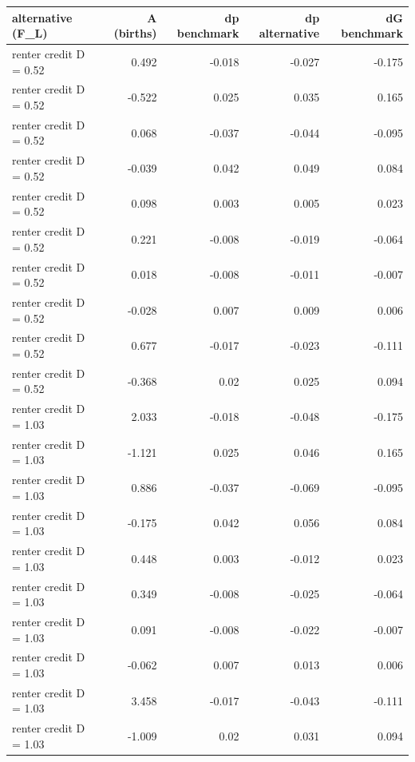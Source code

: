 \begin{tabular}{lrrrr}
\toprule
alternative (F\_L) & A (births) & dp benchmark & dp alternative & dG benchmark \\
\midrule
renter credit D = 0.52 & 0.492 & -0.018 & -0.027 & -0.175 \\
renter credit D = 0.52 & -0.522 & 0.025 & 0.035 & 0.165 \\
renter credit D = 0.52 & 0.068 & -0.037 & -0.044 & -0.095 \\
renter credit D = 0.52 & -0.039 & 0.042 & 0.049 & 0.084 \\
renter credit D = 0.52 & 0.098 & 0.003 & 0.005 & 0.023 \\
renter credit D = 0.52 & 0.221 & -0.008 & -0.019 & -0.064 \\
renter credit D = 0.52 & 0.018 & -0.008 & -0.011 & -0.007 \\
renter credit D = 0.52 & -0.028 & 0.007 & 0.009 & 0.006 \\
renter credit D = 0.52 & 0.677 & -0.017 & -0.023 & -0.111 \\
renter credit D = 0.52 & -0.368 & 0.02 & 0.025 & 0.094 \\
renter credit D = 1.03 & 2.033 & -0.018 & -0.048 & -0.175 \\
renter credit D = 1.03 & -1.121 & 0.025 & 0.046 & 0.165 \\
renter credit D = 1.03 & 0.886 & -0.037 & -0.069 & -0.095 \\
renter credit D = 1.03 & -0.175 & 0.042 & 0.056 & 0.084 \\
renter credit D = 1.03 & 0.448 & 0.003 & -0.012 & 0.023 \\
renter credit D = 1.03 & 0.349 & -0.008 & -0.025 & -0.064 \\
renter credit D = 1.03 & 0.091 & -0.008 & -0.022 & -0.007 \\
renter credit D = 1.03 & -0.062 & 0.007 & 0.013 & 0.006 \\
renter credit D = 1.03 & 3.458 & -0.017 & -0.043 & -0.111 \\
renter credit D = 1.03 & -1.009 & 0.02 & 0.031 & 0.094 \\
\bottomrule
\end{tabular}

